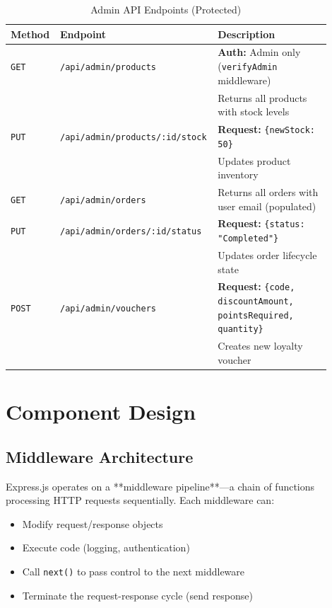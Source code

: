 \begin{table}[H]
\centering
\caption{Admin API Endpoints (Protected)}
\label{tab:api_admin}
\small
\begin{tabular}{@{}p{0.15\linewidth}p{0.40\linewidth}p{0.35\linewidth}@{}}
\toprule
\textbf{Method} & \textbf{Endpoint} & \textbf{Description} \\
\midrule
\texttt{GET} & \texttt{/api/admin/products} & 
\textbf{Auth:} Admin only (\texttt{verifyAdmin} middleware) \\
& & Returns all products with stock levels \\
\midrule
\texttt{PUT} & \texttt{/api/admin/products/:id/stock} & 
\textbf{Request:} \texttt{\{newStock: 50\}} \\
& & Updates product inventory \\
\midrule
\texttt{GET} & \texttt{/api/admin/orders} & 
Returns all orders with user email (populated) \\
\midrule
\texttt{PUT} & \texttt{/api/admin/orders/:id/status} & 
\textbf{Request:} \texttt{\{status: "Completed"\}} \\
& & Updates order lifecycle state \\
\midrule
\texttt{POST} & \texttt{/api/admin/vouchers} & 
\textbf{Request:} \texttt{\{code, discountAmount, pointsRequired, quantity\}} \\
& & Creates new loyalty voucher \\
\bottomrule
\end{tabular}
\end{table}

\section{Component Design}

\subsection{Middleware Architecture}

Express.js operates on a **middleware pipeline**—a chain of functions processing HTTP requests sequentially. Each middleware can:
\begin{itemize}
    \item Modify request/response objects
    \item Execute code (logging, authentication)
    \item Call \texttt{next()} to pass control to the next middleware
    \item Terminate the request-response cycle (send response)
\end{itemize}

